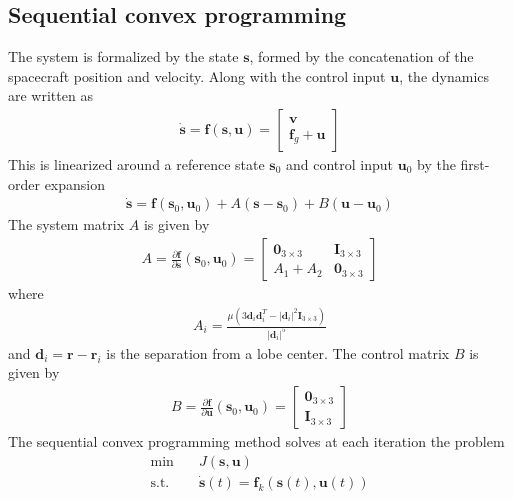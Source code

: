 \documentclass{article}
\newcommand{\PD}[2]{\frac{\partial#1}{\partial#2}}
\begin{document}
\begin{multicols}{2}
\section*{Sequential convex programming}
The system is formalized by the state $\mathbf{s}$, formed by the concatenation of the spacecraft position and velocity. Along with the control input $\mathbf{u}$, the dynamics are written as
\begin{align*}
	\dot{\mathbf{s}} = \mathbf{f}(\mathbf{s}, \mathbf{u}) = 
	\begin{bmatrix}
	\mathbf{v}\\
	\mathbf{f}_{g} + \mathbf{u}
	\end{bmatrix}
\end{align*}
This is linearized around a reference state $\mathbf{s}_{0}$ and control input $\mathbf{u}_{0}$ by the first-order expansion
\begin{align*}
	\dot{\mathbf{s}} = \mathbf{f}(\mathbf{s}_{0}, \mathbf{u}_{0}) + A(\mathbf{s} - \mathbf{s}_{0}) + B(\mathbf{u} - \mathbf{u}_{0})
\end{align*}
The system matrix $A$ is given by
\begin{align*}
	A = \PD{\mathbf{f}}{\mathbf{s}}(\mathbf{s}_{0}, \mathbf{u}_{0}) =
	\begin{bmatrix}
	\mathbf{0}_{3\times3} & \mathbf{I}_{3\times3}\\
	A_{1} + A_{2} & \mathbf{0}_{3\times3}
	\end{bmatrix}
\end{align*}
where
\begin{align*}
	A_{i} = \frac{\mu(3\mathbf{d}_{i}\mathbf{d}_{i}^{T} - |\mathbf{d}_{i}|^{2}\mathbf{I}_{3\times3})}{|\mathbf{d}_{i}|^{5}}
\end{align*}
and $\mathbf{d}_{i} = \mathbf{r} - \mathbf{r}_{i}$ is the separation from a lobe center. The control matrix $B$ is given by
\begin{align*}
	B = \PD{\mathbf{f}}{\mathbf{u}}(\mathbf{s}_{0}, \mathbf{u}_{0}) = 
	\begin{bmatrix}
	\mathbf{0}_{3\times3}\\
	\mathbf{I}_{3\times3}
	\end{bmatrix}
\end{align*}
The sequential convex programming method solves at each iteration the problem
\begin{align*}
	\text{min} &\quad J(\mathbf{s}, \mathbf{u})\\
	\text{s.t.} &\quad \dot{\mathbf{s}}(t) = \mathbf{f}_{k}(\mathbf{s}(t), \mathbf{u}(t))\\

\end{align*}
\end{multicols}
\end{document}
